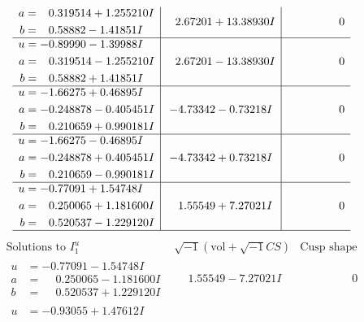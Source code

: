 \documentclass[1p]{elsarticle_modified}
\theoremstyle{definition}
\newcommand{\I}{\sqrt{-1}}
\begin{document}
$$\begin{array}{c|c|c}
\begin{aligned}
a &= \phantom{-}0.319514 + 1.255210 I \\
b &= \phantom{-}0.58882 - 1.41851 I\end{aligned}
 & \phantom{-}2.67201 + 13.38930 I & \phantom{-0.000000 } 0 \\ \hline\begin{aligned}
u &= -0.89990 - 1.39988 I \\
a &= \phantom{-}0.319514 - 1.255210 I \\
b &= \phantom{-}0.58882 + 1.41851 I\end{aligned}
 & \phantom{-}2.67201 - 13.38930 I & \phantom{-0.000000 } 0 \\ \hline\begin{aligned}
u &= -1.66275 + 0.46895 I \\
a &= -0.248878 - 0.405451 I \\
b &= \phantom{-}0.210659 + 0.990181 I\end{aligned}
 & -4.73342 - 0.73218 I & \phantom{-0.000000 } 0 \\ \hline\begin{aligned}
u &= -1.66275 - 0.46895 I \\
a &= -0.248878 + 0.405451 I \\
b &= \phantom{-}0.210659 - 0.990181 I\end{aligned}
 & -4.73342 + 0.73218 I & \phantom{-0.000000 } 0 \\ \hline\begin{aligned}
u &= -0.77091 + 1.54748 I \\
a &= \phantom{-}0.250065 + 1.181600 I \\
b &= \phantom{-}0.520537 - 1.229120 I\end{aligned}
 & \phantom{-}1.55549 + 7.27021 I & \phantom{-0.000000 } 0\\
 \hline 
 \end{array}$$\newpage$$\begin{array}{c|c|c}  
\text{Solutions to }I^u_{1}& \I (\text{vol} + \sqrt{-1}CS) & \text{Cusp shape}\\
 \hline 
\begin{aligned}
u &= -0.77091 - 1.54748 I \\
a &= \phantom{-}0.250065 - 1.181600 I \\
b &= \phantom{-}0.520537 + 1.229120 I\end{aligned}
 & \phantom{-}1.55549 - 7.27021 I & \phantom{-0.000000 } 0 \\ \hline\begin{aligned}
u &= -0.93055 + 1.47612 I \\

\end{aligned}
\end{array}$$
\end{document}
